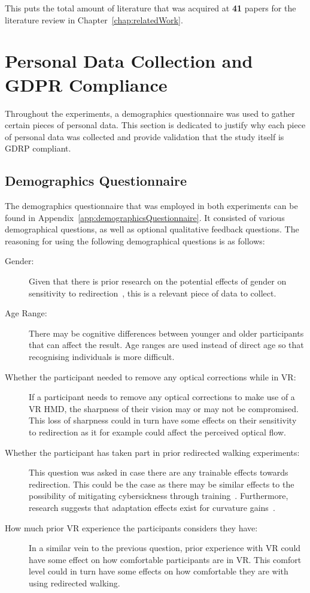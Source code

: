 This puts the total amount of literature that was acquired at \textbf{41} papers for the literature review in Chapter~\ref{chap:relatedWork}.

\section{Personal Data Collection and GDPR Compliance}
Throughout the experiments, a demographics questionnaire was used to gather certain pieces of personal data. This section is dedicated to justify why each piece of personal data was collected and provide validation that the study itself is GDRP compliant. 

\subsection{Demographics Questionnaire}
The demographics questionnaire that was employed in both experiments can be found in Appendix~\ref{app:demographicsQuestionnaire}. It consisted of various demographical questions, as well as optional qualitative feedback questions. The reasoning for using the following demographical questions is as follows:

\begin{description}
   \item[Gender:] Given that there is prior research on the potential effects of gender on sensitivity to redirection~\cite{nguyen2018individual}, this is a relevant piece of data to collect. 
   \item[Age Range:] There may be cognitive differences between younger and older participants that can affect the result. Age ranges are used instead of direct age so that recognising individuals is more difficult. 
   \item[Whether the participant needed to remove any optical corrections while in VR:] If a participant needs to remove any optical corrections to make use of a VR HMD, the sharpness of their vision may or may not be compromised. This loss of sharpness could in turn have some effects on their sensitivity to redirection as it for example could affect the perceived optical flow. 
   \item[Whether the participant has taken part in prior redirected walking experiments:] This question was asked in case there are any trainable effects towards redirection. This could be the case as there may be similar effects to the possibility of mitigating cybersickness through training~\cite{hildebrandt2018get}. Furthermore, research suggests that adaptation effects exist for curvature gains~\cite{nguyen2018individual}.
   \item[How much prior VR experience the participants considers they have:] In a similar vein to the previous question, prior experience with VR could have some effect on how comfortable participants are in VR. This comfort level could in turn have some effects on how comfortable they are with using redirected walking.
\end{description}

